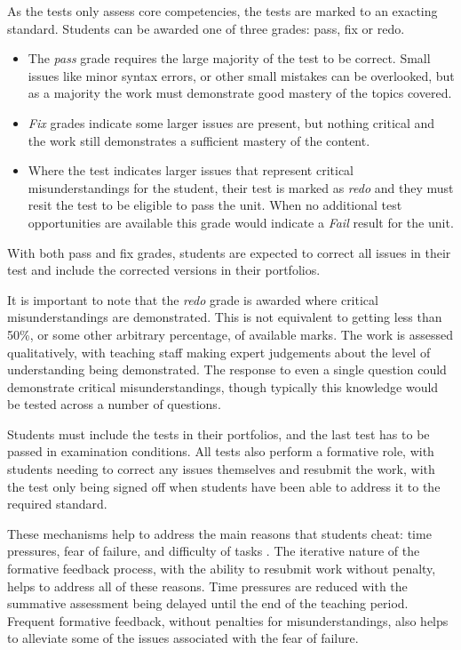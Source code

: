 As the tests only assess core competencies, the tests are marked to an exacting standard. Students can be awarded one of three grades: pass, fix or redo. 
\begin{itemize}[noitemsep,nolistsep]
	\item The \emph{pass} grade requires the large majority of the test to be correct. Small issues like minor syntax errors, or other small mistakes can be overlooked, but as a majority the work must demonstrate good mastery of the topics covered. 
	\item \emph{Fix} grades indicate some larger issues are present, but nothing critical and the work still demonstrates a sufficient mastery of the content.
	\item Where the test indicates larger issues that represent critical misunderstandings for the student, their test is marked as \emph{redo} and they must resit the test to be eligible to pass the unit. When no additional test opportunities are available this grade would indicate a \emph{Fail} result for the unit.
\end{itemize}
With both pass and fix grades, students are expected to correct all issues in their test and include the corrected versions in their portfolios. 

It is important to note that the \emph{redo} grade is awarded where critical misunderstandings are demonstrated. This is not equivalent to getting less than 50\%, or some other arbitrary percentage, of available marks. The work is assessed qualitatively, with teaching staff making expert judgements about the level of understanding being demonstrated. The response to even a single question could demonstrate critical misunderstandings, though typically this knowledge would be tested across a number of questions.

Students must include the tests in their portfolios, and the last test has to be passed in examination conditions. All tests also perform a formative role, with students needing to correct any issues themselves and resubmit the work, with the test only being signed off when students have been able to address it to the required standard.

These mechanisms help to address the main reasons that students cheat: time pressures, fear of failure, and difficulty of tasks \citep{Sheard:2003}. The iterative nature of the formative feedback process, with the ability to resubmit work without penalty, helps to address all of these reasons. Time pressures are reduced with the summative assessment being delayed until the end of the teaching period. Frequent formative feedback, without penalties for misunderstandings, also helps to alleviate some of the issues associated with the fear of failure.


